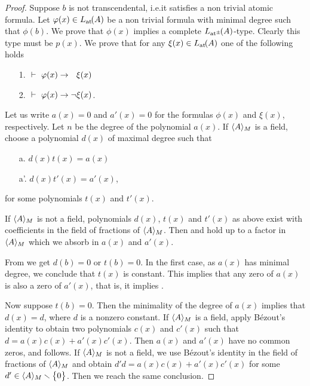 \documentclass[creche.tex]{subfiles}
\begin{document}
\begin{proof}
Suppose $b$ is not transcendental, i.e.\@ it satisfies a non trivial atomic formula. Let $\varphi(x)\in L_{\tiny\rm at}\hskip-.3ex(A)$ be a non trivial formula with minimal degree such that $\phi(b)$.  We prove that $\phi(x)$ implies a complete $L_{{\tiny\rm at^\pm}}\hskip-.3ex(A)$-type.  Clearly this type must be $p(x)$. We prove that for any $\xi(x)\in L_{\tiny\rm at}\hskip-.3ex(A)$ one of the following holds
\begin{itemize}
\item[1.] $\ \proves\ \phi(x)\imp\phantom{\neg}\xi(x)$
\item[2.] $\ \proves\ \phi(x)\imp\neg\xi(x)$.
\end{itemize} 
Let us write $a(x)=0$ and $a'(x)=0$ for the formulas $\phi(x)$ and $\xi(x)$, respectively. Let $n$ be the degree of the polynomial $a(x)$. If $\langle A\rangle_M$ is a field, choose a polynomial $d(x)$ of maximal degree such that
\begin{itemize}
\item[a.] $d(x)t(x)=a(x)$
\item[a'.] $d(x)t'(x)=a'(x)$,
\end{itemize} 
for some polynomials $t(x)$ and $t'(x)$. 

If $\langle A\rangle_M$ is not a field, polynomials $d(x)$, $t(x)$ and $t'(x)$ as above exist with coefficients in the field of fractions of $\langle A\rangle_M$. Then  and  hold up to a factor in $\langle A\rangle_M$ which we absorb in $a(x)$ and $a'(x)$. 

From  we get $d(b)=0$ or $t(b)=0$. In the first case, as $a(x)$ has minimal degree, we conclude that $t(x)$ is constant.  This implies that any zero of $a(x)$ is also a zero of $a'(x)$, that is, it implies . 

Now suppose $t(b)=0$. Then the minimality of the degree of $a(x)$ implies that $d(x)=d$, where $d$ is a nonzero constant. If $\langle A\rangle_M$ is a field, apply B\'ezout's identity to obtain two polynomials $c(x)$ and $c'(x)$ such that $d=a(x)c(x)+a'(x)c'(x)$. Then $a(x)$ and $a'(x)$ have no common zeros, and  follows. If $\langle A\rangle_M$ is not a field, we use  B\'ezout's identity in the field of fractions of $\langle A\rangle_M$ and obtain $d'd=a(x)c(x)+a'(x)c'(x)$ for some $d'\in\langle A\rangle_M\smallsetminus\big\{0\big\}$. Then we reach the same conclusion.
\end{proof}




\end{document}
